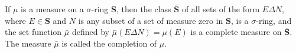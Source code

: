 If $\mu$ is a measure on a $\sigma$-ring $\mathbf{S}$, then the class $\bar{\mathbf{S}}$ of all sets of the form $E \Delta N$, where $E \in \mathbf{S}$ and $N$ is any subset of a set of measure zero in $\mathbf{S}$, is a $\sigma$-ring, and the set function $\bar{\mu}$ defined by $\bar{\mu}(E \Delta N) = \mu(E)$ is a complete measure on $\bar{\mathbf{S}}$. The measure $\bar{\mu}$ is called the completion of $\mu$.
